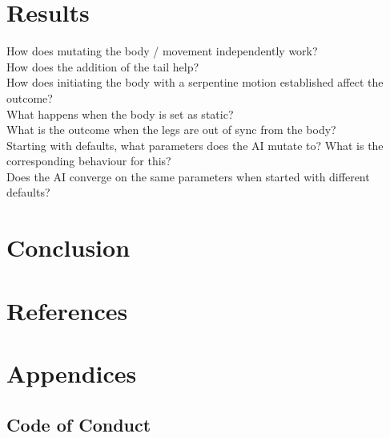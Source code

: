\documentclass{article}
\begin{document}
\newpage
\section{Results}
How does mutating the body / movement independently work?\\
How does the addition of the tail help?\\
How does initiating the body with a serpentine motion established affect the outcome?\\
What happens when the body is set as static?\\
What is the outcome when the legs are out of sync from the body?\\
Starting with defaults, what parameters does the AI mutate to? What is the corresponding behaviour for this?\\
Does the AI converge on the same parameters when started with different defaults?\\



\newpage
\section{Conclusion}

\newpage

\section{References}

\newpage
\section{Appendices}
\subsection{Code of Conduct}
\end{document}
